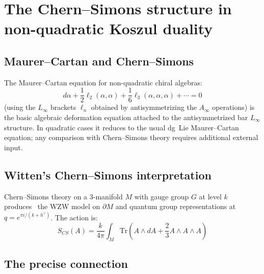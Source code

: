 \section{The Chern--Simons structure in non-quadratic Koszul duality}

\subsection{Maurer--Cartan and Chern--Simons}

The Maurer--Cartan equation for non-quadratic chiral algebras:
\[
d\alpha + \frac{1}{2}\ell_2(\alpha, \alpha) + \frac{1}{6}\ell_3(\alpha, \alpha, \alpha) + \cdots = 0
\]
(using the $L_\infty$ brackets $\ell_n$ obtained by antisymmetrizing the $A_\infty$ operations)
is the basic algebraic deformation equation attached to the
antisymmetrized bar $L_\infty$ structure. In quadratic cases it
reduces to the usual dg~Lie Maurer--Cartan equation; any comparison
with Chern--Simons theory requires additional external input.

\subsection{Witten's Chern--Simons interpretation}

Chern--Simons theory on a 3-manifold $M$ with gauge group $G$ at level $k$ produces~\cite{Wit89} the WZW model on $\partial M$ and quantum group representations at $q = e^{\pi i/(k+h^\vee)}$. The action is:
\[
S_{CS}(A) = \frac{k}{4\pi} \int_M \text{Tr}\left(A \wedge dA + \frac{2}{3}A \wedge A \wedge A\right)
\]

\subsection{The precise connection}


